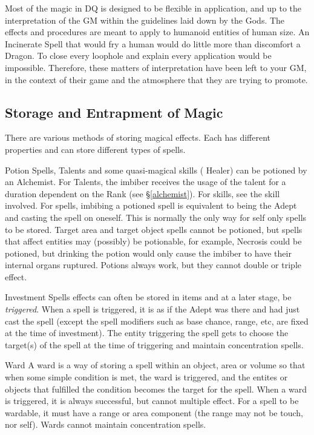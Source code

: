 \begin{multicols*}{3}
Most of the magic in DQ is designed to be flexible in application, and
up to the interpretation of the GM within the guidelines laid down by
the Gods. The effects and procedures are meant to apply to humanoid
entities of human size.  An Incinerate Spell that would fry a human
would do little more than discomfort a Dragon. To close every loophole
and explain every application would be impossible. Therefore, these
matters of interpretation have been left to your GM, in the context of
their game and the atmosphere that they are trying to promote.

\subsection{Storage and Entrapment of Magic}

There are various methods of storing magical effects.  Each has
different properties and can store different types of spells.

\begin{Description}

\item[Potion] Spells, Talents and some quasi-magical skills (\eg
Healer) can be potioned by an Alchemist.  For Talents, the imbiber
receives the usage of the talent for a duration dependent on the Rank
(see \S\ref{alchemist}).  For skills, see the skill involved.  For
spells, imbibing a potioned spell is equivalent to being the Adept and
casting the spell on oneself.  This is normally the only way for self
only spells to be stored.  Target area and target object spells cannot
be potioned, but spells that affect entities may (possibly) be
potionable, for example, Necrosis could be potioned, but drinking the
potion would only cause the imbiber to have their internal organs
ruptured.  Potions always work, but they cannot double or triple
effect.

\item[Investment] Spells effects can often be stored in items and at
a later stage, be \emph{triggered}.  When a spell is triggered, it is
as if the Adept was there and had just cast the spell (except the
spell modifiers such as base chance, range, etc, are fixed at the
time of investment).  The entity triggering the spell gets to choose
the target(s) of the spell at the time of triggering and maintain
concentration spells.

\item[Ward] A ward is a way of storing a spell within an object, area
or volume so that when some simple condition is met, the ward is
triggered, and the entites or objects that fulfilled the condition
becomes the target for the spell.  When a ward is triggered, it is
always successful, but cannot multiple effect.  For a spell to be
wardable, it must have a range or area component (the range may not be
touch, nor self).  Wards cannot maintain concentration spells.


\end{Description}
\end{multicols*}
